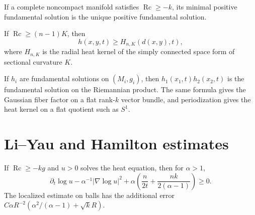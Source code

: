\begin{theorem}
\label{thm:chow-ii-heat-kernel-uniqueness-lower-ricci}

If a complete noncompact manifold satisfies $\operatorname{Rc}\ge-k$, its
minimal positive fundamental solution is the unique positive fundamental
solution.
\end{theorem}

\begin{theorem}
\label{thm:chow-ii-cheeger-yau-heat-comparison}


If $\operatorname{Rc}\ge(n-1)K$, then
\[
h(x,y,t)\ge H_{n,K}(d(x,y),t),
\]
where $H_{n,K}$ is the radial heat kernel of the simply connected space form
of sectional curvature $K$.
\end{theorem}

\begin{theorem}
\label{thm:chow-ii-heat-kernel-products}

If $h_i$ are fundamental solutions on $(M_i,g_i)$, then
$h_1(x_1,t)h_2(x_2,t)$ is the fundamental solution on the Riemannian product.
The same formula gives the Gaussian fiber factor on a flat rank-$k$ vector
bundle, and periodization gives the heat kernel on a flat quotient such as
$S^1$.
\end{theorem}

\section{Li--Yau and Hamilton estimates}

\begin{theorem}
\label{thm:chow-ii-li-yau-estimate}

If $\operatorname{Rc}\ge-kg$ and $u>0$ solves the heat equation, then for
$\alpha>1$,
\[
\partial_t\log u-\alpha^{-1}|\nabla\log u|^2
+\alpha\left(\frac n{2t}+\frac{nk}{2(\alpha-1)}\right)\ge0.
\]
The localized estimate on balls has the additional error
$C\alpha R^{-2}(\alpha^2/(\alpha-1)+\sqrt{k}R)$.
\end{theorem}

